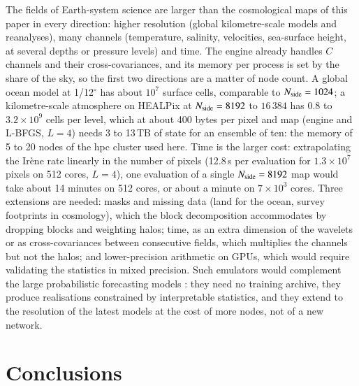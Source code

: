 \documentclass{aa}
\newcommand{\nside}{N_{\rm side}}
\begin{document}
The fields of Earth-system science are larger than the cosmological maps of this paper in every direction: higher resolution (global kilometre-scale models and reanalyses), many channels (temperature, salinity, velocities, sea-surface height, at several depths or pressure levels) and time. The engine already handles $C$ channels and their cross-covariances, and its memory per process is set by the share of the sky, so the first two directions are a matter of node count. A global ocean model at 1/12$^\circ$ has about $10^7$ surface cells, comparable to $\nside=1024$; a kilometre-scale atmosphere on HEALPix at $\nside=8192$ to $16\,384$ has $0.8$ to $3.2\times10^9$ cells per level, which at about 400 bytes per pixel and map (engine and L-BFGS, $L=4$) needs 3 to 13\,TB of state for an ensemble of ten: the memory of 5 to 20 nodes of the hpc cluster used here. Time is the larger cost: extrapolating the Ir\`ene rate linearly in the number of pixels (12.8\,s per evaluation for $1.3\times10^7$ pixels on 512 cores, $L=4$), one evaluation of a single $\nside=8192$ map would take about 14 minutes on 512 cores, or about a minute on $7\times10^3$ cores. Three extensions are needed: masks and missing data (land for the ocean, survey footprints in cosmology), which the block decomposition accommodates by dropping blocks and weighting halos; time, as an extra dimension of the wavelets or as cross-covariances between consecutive fields, which multiplies the channels but not the halos; and lower-precision arithmetic on GPUs, which would require validating the statistics in mixed precision. Such emulators would complement the large probabilistic forecasting models \citep{price2025}: they need no training archive, they produce realisations constrained by interpretable statistics, and they extend to the resolution of the latest models at the cost of more nodes, not of a new network.

\section{Conclusions}
\label{sec:conclusions}
\end{document}
